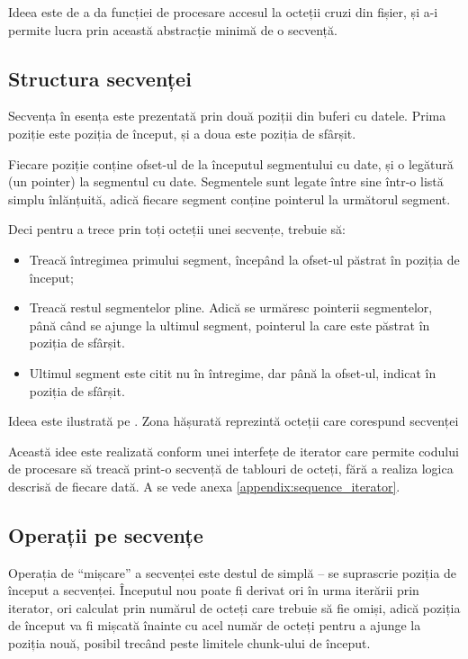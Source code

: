 \documentclass[a4paper,12pt]{report}
\begin{document}
Ideea este de a da funcției de procesare accesul la octeții cruzi din fișier,
și a-i permite lucra prin această abstracție minimă de o secvență.

\subsection{Structura secvenței}

Secvența în esența este prezentată prin două poziții din buferi cu datele.
Prima poziție este poziția de început, și a doua este poziția de sfârșit.

Fiecare poziție conține ofset-ul de la începutul segmentului cu date,
și o legătură (un pointer) la segmentul cu date.
Segmentele sunt legate între sine într-o listă simplu înlănțuită, adică
fiecare segment conține pointerul la următorul segment.

Deci pentru a trece prin toți octeții unei secvențe, trebuie să:
\begin{itemize}
    \item
        Treacă întregimea primului segment, începând la ofset-ul păstrat în poziția de început;
    \item
        Treacă restul segmentelor pline.
        Adică se urmăresc pointerii segmentelor, până când se ajunge la ultimul segment,
        pointerul la care este păstrat în poziția de sfârșit.
    \item
        Ultimul segment este citit nu în întregime, dar până la ofset-ul,
        indicat în poziția de sfârșit.
\end{itemize}

Ideea este ilustrată pe .
Zona hășurată reprezintă octeții care corespund secvenței


Această idee este realizată conform unei interfețe de iterator care permite codului de procesare
să treacă print-o secvență de tablouri de octeți, fără a realiza logica descrisă de fiecare dată.
A se vede anexa \ref{appendix:sequence_iterator}.

\subsection{Operații pe secvențe}

Operația de ``mișcare'' a secvenței este destul de simplă -- se suprascrie poziția de început a secvenței.
Începutul nou poate fi derivat ori în urma iterării prin iterator,
ori calculat prin numărul de octeți care trebuie să fie omiși,
adică poziția de început va fi mișcată înainte cu acel număr de octeți
pentru a ajunge la poziția nouă, posibil trecând peste limitele chunk-ului de început.
\end{document}

